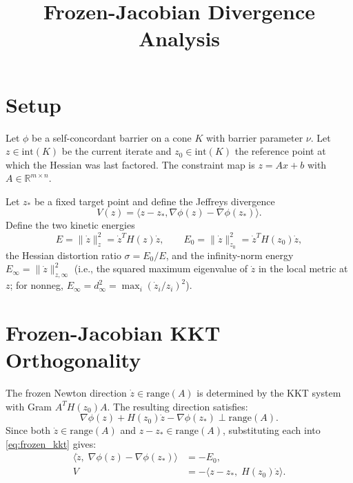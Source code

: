 \documentclass[11pt]{article}
\title{\textbf{Frozen-Jacobian Divergence Analysis}}
\author{}
\date{\vspace{-5ex}}
\begin{document}
\maketitle

\section{Setup}

Let $\phi$ be a self-concordant barrier on a cone $K$ with barrier
parameter $\nu$.  Let $z \in \mathrm{int}(K)$ be the current iterate
and $z_0 \in \mathrm{int}(K)$ the reference point at which the Hessian
was last factored.  The constraint map is $z = Ax + b$ with
$A \in \mathbb{R}^{m \times n}$.

Let $z_*$ be a fixed target point and define the Jeffreys divergence
\begin{equation}
    V(z) = \langle z - z_*, \nabla\phi(z) - \nabla\phi(z_*) \rangle.
\end{equation}
Define the two kinetic energies
\begin{equation}
    E = \|\dot{z}\|_z^2 = \dot{z}^T H(z)\dot{z}, \qquad
    E_0 = \|\dot{z}\|_{z_0}^2 = \dot{z}^T H(z_0)\dot{z},
\end{equation}
the Hessian distortion ratio $\sigma = E_0 / E$, and the infinity-norm
energy $E_\infty = \|\dot{z}\|_{z,\infty}^2$ (i.e., the squared
maximum eigenvalue of $\dot{z}$ in the local metric at $z$; for
nonneg, $E_\infty = d_\infty^2 = \max_i(\dot{z}_i/z_i)^2$).

\section{Frozen-Jacobian KKT Orthogonality}

The frozen Newton direction $\dot{z} \in \mathrm{range}(A)$ is
determined by the KKT system with Gram $A^T H(z_0) A$.  The resulting
direction satisfies:
\begin{equation} \label{eq:frozen_kkt}
    \nabla\phi(z) + H(z_0)\dot{z} - \nabla\phi(z_*) \perp \mathrm{range}(A).
\end{equation}
Since both $\dot{z} \in \mathrm{range}(A)$ and
$z - z_* \in \mathrm{range}(A)$, substituting each into
\eqref{eq:frozen_kkt} gives:
\begin{align}
    \langle \dot{z},\; \nabla\phi(z) - \nabla\phi(z_*) \rangle
        &= -E_0, \label{eq:orth_zdot} \\
    V &= -\langle z - z_*,\; H(z_0)\dot{z} \rangle. \label{eq:orth_v}
\end{align}
\end{document}
